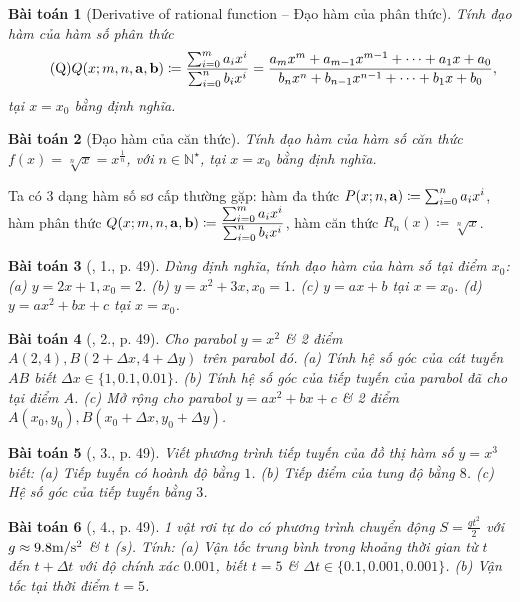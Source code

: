 \documentclass[oneside]{book}
\newtheorem{baitoan}{Bài toán}
\begin{document}
\begin{baitoan}[Derivative of rational function -- Đạo hàm của phân thức]
	Tính đạo hàm của hàm số phân thức
	\begin{equation}
		\label{rational function}
		\tag{Q}
		Q(x;m,n,{\bf a},{\bf b})\coloneqq\frac{\sum_{i=0}^m a_ix^i}{\sum_{i=0}^n b_ix^i} = \frac{a_mx^m + a_{m-1}x^{m-1} + \cdots + a_1x + a_0}{b_nx^n + b_{n-1}x^{n-1} + \cdots + b_1x + b_0},
	\end{equation}
	tại $x = x_0$ bằng định nghĩa.
\end{baitoan}

\begin{baitoan}[Đạo hàm của căn thức]
	Tính đạo hàm của hàm số căn thức $f(x) = \sqrt[n]{x} = x^{\frac{1}{n}}$, với $n\in\mathbb{N}^\star$, tại $x = x_0$ bằng định nghĩa.
\end{baitoan}
Ta có 3 dạng hàm số sơ cấp thường gặp: hàm đa thức $P(x;n,{\bf a})\coloneqq\sum_{i=0}^n a_ix^i$, hàm phân thức $Q(x;m,n,{\bf a},{\bf b})\coloneqq\dfrac{\sum_{i=0}^m a_ix^i}{\sum_{i=0}^n b_ix^i}$, hàm căn thức $R_n(x)\coloneqq\sqrt[n]{x}$.

\begin{baitoan}[\cite{TLCT_BT_dai_so_giai_tich_11}, 1., p. 49]
	Dùng định nghĩa, tính đạo hàm của hàm số tại điểm $x_0$: (a) $y = 2x + 1,x_0 = 2$. (b) $y = x^2 + 3x,x_0 = 1$. (c) $y = ax + b$ tại $x = x_0$. (d) $y = ax^2 + bx + c$ tại $x = x_0$.
\end{baitoan}

\begin{baitoan}[\cite{TLCT_BT_dai_so_giai_tich_11}, 2., p. 49]
	Cho parabol $y = x^2$ \& 2 điểm $A(2,4),B(2 + \Delta x,4 + \Delta y)$ trên parabol đó. (a) Tính hệ số góc của cát tuyến $AB$ biết $\Delta x\in\{1,0.1,0.01\}$. (b) Tính hệ số góc của tiếp tuyến của parabol đã cho tại điểm $A$. (c) Mở rộng cho parabol $y = ax^2 + bx + c$ \& 2 điểm $A(x_0,y_0),B(x_0 + \Delta x,y_0 + \Delta y)$.
\end{baitoan}

\begin{baitoan}[\cite{TLCT_BT_dai_so_giai_tich_11}, 3., p. 49]
	Viết phương trình tiếp tuyến của đồ thị hàm số $y = x^3$ biết: (a) Tiếp tuyến có hoành độ bằng $1$. (b) Tiếp điểm của tung độ bằng $8$. (c) Hệ số góc của tiếp tuyến bằng $3$.
\end{baitoan}

\begin{baitoan}[\cite{TLCT_BT_dai_so_giai_tich_11}, 4., p. 49]
	1 vật rơi tự do có phương trình chuyển động $S = \frac{gt^2}{2}$ với $g\approx9.8{\rm m{\tt/}s^2}$ \& $t$ (s). Tính: (a) Vận tốc trung bình trong khoảng thời gian từ $t$ đến $t + \Delta t$ với độ chính xác $0.001$, biết $t = 5$ \& $\Delta t\in\{0.1,0.001,0.001\}$. (b) Vận tốc tại thời điểm $t = 5$.
\end{baitoan}
\end{document}
